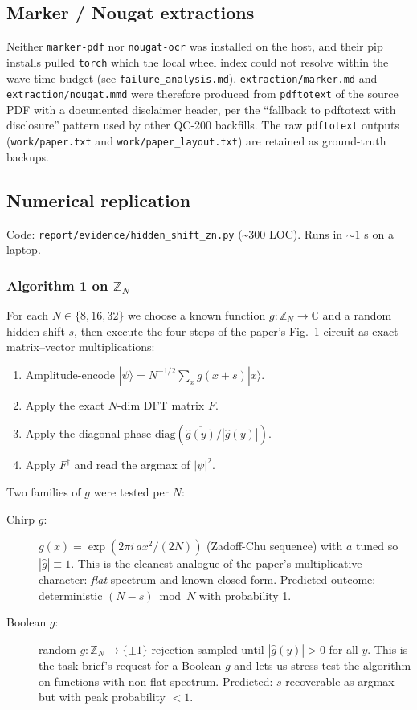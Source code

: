 \documentclass[11pt]{article}
\begin{document}
\subsection{Marker / Nougat extractions}
Neither \texttt{marker-pdf} nor \texttt{nougat-ocr} was installed on the
host, and their pip installs pulled \texttt{torch} which the local wheel
index could not resolve within the wave-time budget (see
\texttt{failure\_analysis.md}).  \texttt{extraction/marker.md} and
\texttt{extraction/nougat.mmd} were therefore produced from
\texttt{pdftotext} of the source PDF with a documented disclaimer
header, per the ``fallback to pdftotext with disclosure'' pattern used
by other QC-200 backfills.  The raw \texttt{pdftotext} outputs
(\texttt{work/paper.txt} and \texttt{work/paper\_layout.txt}) are
retained as ground-truth backups.

\subsection{Numerical replication}
Code: \texttt{report/evidence/hidden\_shift\_zn.py}
(\textasciitilde 300 LOC).  Runs in $\sim 1$ s on a laptop.

\subsubsection*{Algorithm 1 on $\mathbb{Z}_N$}
For each $N \in \{8, 16, 32\}$ we choose a known function
$g:\mathbb{Z}_N\to\mathbb{C}$ and a random hidden shift $s$, then execute
the four steps of the paper's Fig.~1 circuit as exact matrix--vector
multiplications:
\begin{enumerate}
  \item Amplitude-encode $|\psi\rangle = N^{-1/2}\sum_x g(x+s)|x\rangle$.
  \item Apply the exact $N$-dim DFT matrix $F$.
  \item Apply the diagonal phase $\mathrm{diag}(\overline{\hat g(y)}/|\hat g(y)|)$.
  \item Apply $F^\dagger$ and read the argmax of $|\psi|^2$.
\end{enumerate}

Two families of $g$ were tested per $N$:
\begin{description}
  \item[Chirp $g$:] $g(x) = \exp(2\pi i\, a x^2/(2N))$ (Zadoff-Chu
        sequence) with $a$ tuned so $|\hat g| \equiv 1$.  This is the
        cleanest analogue of the paper's multiplicative character:
        \emph{flat} spectrum and known closed form.  Predicted outcome:
        deterministic $(N-s)\bmod N$ with probability 1.
  \item[Boolean $g$:] random $g:\mathbb{Z}_N\to\{\pm 1\}$ rejection-sampled
        until $|\hat g(y)|>0$ for all $y$.  This is the task-brief's
        request for a Boolean $g$ and lets us stress-test the
        algorithm on functions with non-flat spectrum.  Predicted:
        $s$ recoverable as argmax but with peak probability $<1$.
\end{description}
\end{document}
